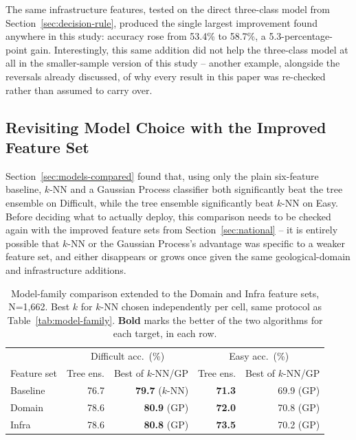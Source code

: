 \documentclass[11pt,a4paper]{article}
\begin{document}
The same infrastructure features, tested on the direct three-class model from Section~\ref{sec:decision-rule}, produced the single largest improvement found anywhere in this study: accuracy rose from 53.4\% to 58.7\%, a 5.3-percentage-point gain. Interestingly, this same addition did not help the three-class model at all in the smaller-sample version of this study -- another example, alongside the reversals already discussed, of why every result in this paper was re-checked rather than assumed to carry over.

\subsection{Revisiting Model Choice with the Improved Feature Set}
\label{sec:model-choice-revisited}
Section~\ref{sec:models-compared} found that, using only the plain six-feature baseline, $k$-NN and a Gaussian Process classifier both significantly beat the tree ensemble on Difficult, while the tree ensemble significantly beat $k$-NN on Easy. Before deciding what to actually deploy, this comparison needs to be checked again with the improved feature sets from Section~\ref{sec:national} -- it is entirely possible that $k$-NN or the Gaussian Process's advantage was specific to a weaker feature set, and either disappears or grows once given the same geological-domain and infrastructure additions.

\begin{table}[H]
\centering\small
\caption{Model-family comparison extended to the Domain and Infra feature sets, N=1{,}662. Best $k$ for $k$-NN chosen independently per cell, same protocol as Table~\ref{tab:model-family}. \textbf{Bold} marks the better of the two algorithms for each target, in each row.}
\label{tab:model-family-extended}
\begin{tabular}{@{}lrrrr@{}}
\toprule
& \multicolumn{2}{c}{Difficult acc.\ (\%)} & \multicolumn{2}{c}{Easy acc.\ (\%)} \\
Feature set & Tree ens. & Best of $k$-NN/GP & Tree ens. & Best of $k$-NN/GP \\
\midrule
Baseline & 76.7 & \textbf{79.7} ($k$-NN) & \textbf{71.3} & 69.9 (GP) \\
Domain & 78.6 & \textbf{80.9} (GP) & \textbf{72.0} & 70.8 (GP) \\
Infra & 78.6 & \textbf{80.8} (GP) & \textbf{73.5} & 70.2 (GP) \\
\bottomrule
\end{tabular}
\end{table}
\end{document}
